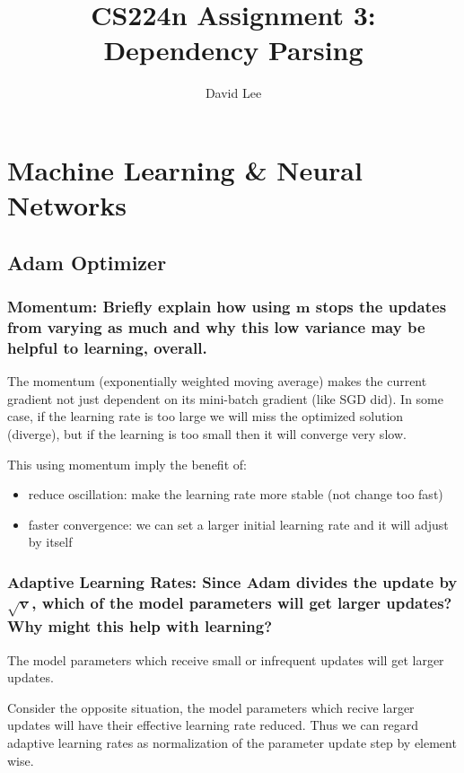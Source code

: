 \documentclass[12pt, letterpaper]{article}
\title{CS224n Assignment 3: \\ Dependency Parsing}
\author{David Lee}
\begin{document}
\maketitle

\section{Machine Learning \& Neural Networks}
\subsection{Adam Optimizer}
\subsubsection{Momentum: Briefly explain how using $\mathbf{m}$ stops the updates from varying as much and why this low variance may be helpful to learning, overall.}

The momentum (exponentially weighted moving average) makes the current gradient not just dependent on its mini-batch gradient (like SGD did). In some case, if the learning rate is too large we will miss the optimized solution (diverge), but if the learning is too small then it will converge very slow.

This using momentum imply the benefit of:

\begin{itemize}
  \item reduce oscillation: make the learning rate more stable (not change too fast)
  \item faster convergence: we can set a larger initial learning rate and it will adjust by itself
\end{itemize}

\subsubsection{Adaptive Learning Rates: Since Adam divides the update by $\sqrt{\mathbf{v}}$, which of the model parameters will get larger updates? Why might this help with learning?}

The model parameters which receive small or infrequent updates will get larger updates.

Consider the opposite situation, the model parameters which recive larger updates will have their effective learning rate reduced. Thus we can regard adaptive learning rates as normalization of the parameter update step by element wise. 
\end{document}
